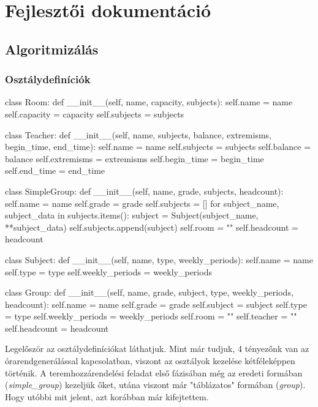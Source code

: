 \chapter{Fejlesztői dokumentáció}

\section{Algoritmizálás}

\subsection{Osztálydefiníciók}

\begin{python}
class Room:
    def __init__(self, name, capacity, subjects):
        self.name = name
        self.capacity = capacity
        self.subjects = subjects


class Teacher:
    def __init__(self, name, subjects, balance, extremisms, begin_time,
                 end_time):
        self.name = name
        self.subjects = subjects
        self.balance = balance
        self.extremisms = extremisms
        self.begin_time = begin_time
        self.end_time = end_time


class SimpleGroup:
    def __init__(self, name, grade, subjects, headcount):
        self.name = name
        self.grade = grade
        self.subjects = []
        for subject_name, subject_data in subjects.items():
            subject = Subject(subject_name, **subject_data)
            self.subjects.append(subject)
        self.room = ""
        self.headcount = headcount


class Subject:
    def __init__(self, name, type, weekly_periods):
        self.name = name
        self.type = type
        self.weekly_periods = weekly_periods


class Group:
    def __init__(self, name, grade, subject, type, weekly_periods,
                 headcount):
        self.name = name
        self.grade = grade
        self.subject = subject
        self.type = type
        self.weekly_periods = weekly_periods
        self.room = ""
        self.teacher = ""
        self.headcount = headcount
\end{python}

Legelőször az osztálydefiníciókat láthatjuk. Mint már tudjuk, 4 tényezőnk van az órarendgenerálással kapcsolatban, viszont az osztályok kezelése kétféleképpen történik. A teremhozzárendelési feladat első fázisában még az eredeti formában (\textit{simple\_group}) kezeljük őket, utána viszont már "táblázatos" formában (\textit{group}). Hogy utóbbi mit jelent, azt korábban már kifejtettem.

